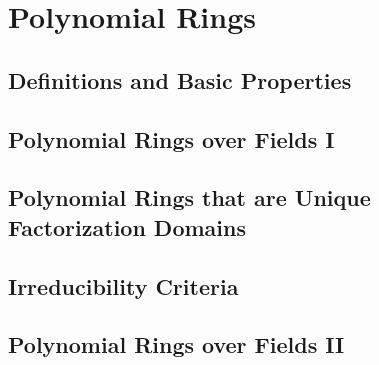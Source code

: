 \chapter{Polynomial Rings}

\section{Definitions and Basic Properties}

\section{Polynomial Rings over Fields I}

\section{Polynomial Rings that are Unique Factorization Domains}

\section{Irreducibility Criteria}

\section{Polynomial Rings over Fields II}